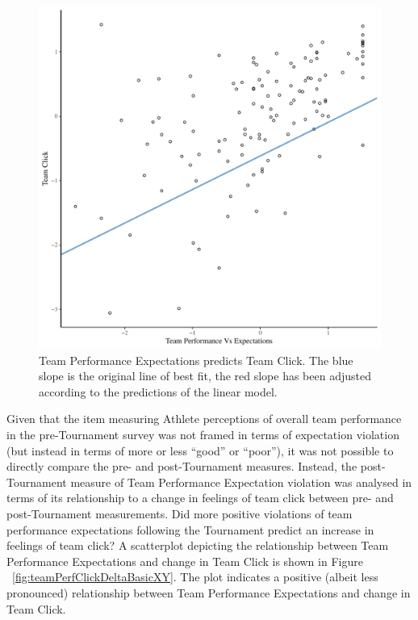   \begin{figure}[htbp]
    \centering
  \includegraphics[scale=.5]{images/teamPerfClickModelSlope.pdf}
    \caption{Team Performance Expectations predicts Team Click. The blue slope is the original line of best fit, the red slope has been adjusted according to the predictions of the linear model.}
    \label{fig:teamPerfClickModelSlope}
  \end{figure}



Given that the item measuring Athlete perceptions of overall team performance in the pre-Tournament survey was not framed in terms of expectation violation (but instead in terms of more or less ``good'' or ``poor''), it was not possible to directly compare the pre- and post-Tournament measures.  Instead, the post-Tournament measure of Team Performance Expectation violation was analysed in terms of its relationship to a change in feelings of team click between pre- and post-Tournament measurements. Did more positive violations of team performance expectations following the Tournament predict an increase in feelings of team click? A scatterplot depicting the relationship between Team Performance Expectations and change in Team Click is shown in Figure ~\ref{fig:teamPerfClickDeltaBasicXY}. The plot indicates a positive (albeit less pronounced) relationship between Team Performance Expectations and change in Team Click.

